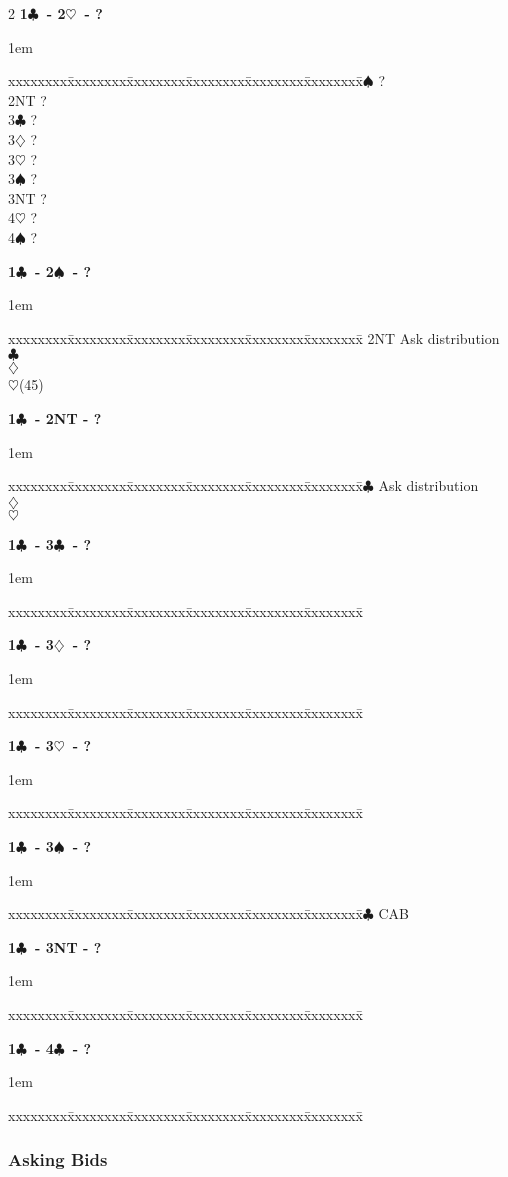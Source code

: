 \documentclass[10pt]{article}
\renewcommand{\c}{$\clubsuit$}
\renewcommand{\d}{$\diamondsuit$}
\newcommand{\h}{$\heartsuit$}
\newcommand{\s}{$\spadesuit$}
\newenvironment{bidtable}[1][]
{\textbf{#1}
  \begin{adjustwidth}{1em}{}
    \addvspace{2pt}
    \begin{tabbing}
      xxxxxxxx\=xxxxxxxx\=xxxxxxxx\=xxxxxxxx\=xxxxxxxx\=xxxxxxxx\=\kill}
{\end{tabbing}\end{adjustwidth}\bigskip}%
\begin{document}
\begin{multicols*}{2}
\begin{bidtable}[1\c\ - 2\h\ - ?]
2\s \> ? \\
2NT \> ? \\
3\c \> ? \\
3\d \> ? \\
3\h \> ? \\
3\s \> ? \\
3NT \> ? \\
4\h \> ? \\
4\s \> ? \\
\end{bidtable}

\begin{bidtable}[1\c\ - 2\s\ - ?]
2NT \> Ask distribution                        \\
    \c {}                        \\
    \d {}                        \\
    \h {}(45)                      \\
\end{bidtable}

\begin{bidtable}[1\c\ - 2NT - ?]
3\c \> Ask distribution    \\
    \d {}\\
    \h {}\\
\end{bidtable}

\begin{bidtable}[1\c\ - 3\c\ - ?]
\end{bidtable}

\begin{bidtable}[1\c\ - 3\d\ - ?]
\end{bidtable}

\begin{bidtable}[1\c\ - 3\h\ - ?]
\end{bidtable}

\begin{bidtable}[1\c\ - 3\s\ - ?]
4\c \> CAB \\
\end{bidtable}

\begin{bidtable}[1\c\ - 3NT - ?]
\end{bidtable}

\begin{bidtable}[1\c\ - 4\c\ - ?]
\end{bidtable}


\subsubsection{Asking Bids}


\end{multicols*}
\end{document}
